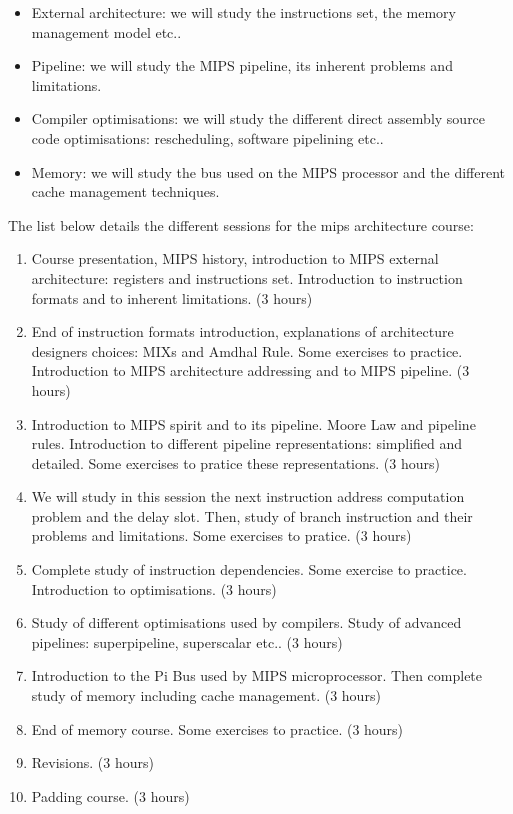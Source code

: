 \begin{multicols}{2}
\begin{itemize}
  \item
    External architecture: we will study the instructions set,
    the memory management model etc..
  \item
    Pipeline: we will study the MIPS pipeline, its inherent problems
    and limitations.
  \item
    Compiler optimisations: we will study the different direct assembly
    source code optimisations: rescheduling, software pipelining etc..
  \item
    Memory: we will study the bus used on the MIPS processor and
    the different cache management techniques.
\end{itemize}

The list below details the different sessions for the mips architecture
course:

\begin{enumerate}
  \item
    Course presentation, MIPS history, introduction to MIPS external
    architecture: registers and instructions set. Introduction to
    instruction formats and to inherent limitations. (3 hours)
  \item
    End of instruction formats introduction, explanations of architecture
    designers choices: MIXs and Amdhal Rule. Some exercises to practice.
    Introduction to MIPS architecture addressing and to MIPS pipeline.
    (3 hours)
  \item
    Introduction to MIPS spirit and to its pipeline. Moore Law and
    pipeline rules. Introduction to different pipeline representations:
    simplified and detailed. Some exercises to pratice these representations.
    (3 hours)
  \item
    We will study in this session the next instruction address computation
    problem and the delay slot. Then, study of branch instruction and their
    problems and limitations. Some exercises to pratice. (3 hours)
  \item
    Complete study of instruction dependencies. Some exercise to practice.
    Introduction to optimisations. (3 hours)
  \item
    Study of different optimisations used by compilers. Study of
    advanced pipelines: superpipeline, superscalar etc.. (3 hours)
  \item
    Introduction to the Pi Bus used by MIPS microprocessor. Then complete
    study of memory including cache management. (3 hours)
  \item
    End of memory course. Some exercises to practice. (3 hours)
  \item
    Revisions. (3 hours)
  \item
    Padding course. (3 hours)
\end{enumerate}




\end{multicols}
